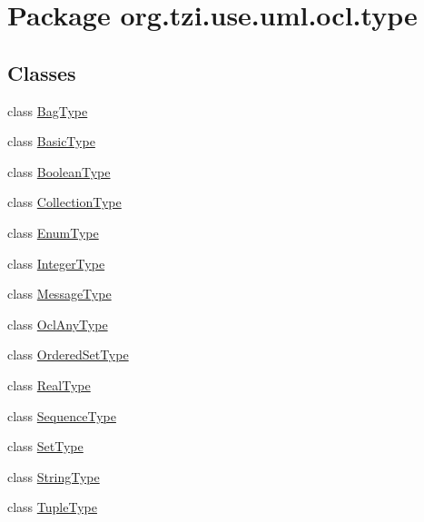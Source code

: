 \hypertarget{namespaceorg_1_1tzi_1_1use_1_1uml_1_1ocl_1_1type}{\section{Package org.\-tzi.\-use.\-uml.\-ocl.\-type}
\label{namespaceorg_1_1tzi_1_1use_1_1uml_1_1ocl_1_1type}
}
\subsection*{Classes}
\begin{DoxyCompactItemize}
\item 
class \hyperlink{classorg_1_1tzi_1_1use_1_1uml_1_1ocl_1_1type_1_1_bag_type}{Bag\-Type}
\item 
class \hyperlink{classorg_1_1tzi_1_1use_1_1uml_1_1ocl_1_1type_1_1_basic_type}{Basic\-Type}
\item 
class \hyperlink{classorg_1_1tzi_1_1use_1_1uml_1_1ocl_1_1type_1_1_boolean_type}{Boolean\-Type}
\item 
class \hyperlink{classorg_1_1tzi_1_1use_1_1uml_1_1ocl_1_1type_1_1_collection_type}{Collection\-Type}
\item 
class \hyperlink{classorg_1_1tzi_1_1use_1_1uml_1_1ocl_1_1type_1_1_enum_type}{Enum\-Type}
\item 
class \hyperlink{classorg_1_1tzi_1_1use_1_1uml_1_1ocl_1_1type_1_1_integer_type}{Integer\-Type}
\item 
class \hyperlink{classorg_1_1tzi_1_1use_1_1uml_1_1ocl_1_1type_1_1_message_type}{Message\-Type}
\item 
class \hyperlink{classorg_1_1tzi_1_1use_1_1uml_1_1ocl_1_1type_1_1_ocl_any_type}{Ocl\-Any\-Type}
\item 
class \hyperlink{classorg_1_1tzi_1_1use_1_1uml_1_1ocl_1_1type_1_1_ordered_set_type}{Ordered\-Set\-Type}
\item 
class \hyperlink{classorg_1_1tzi_1_1use_1_1uml_1_1ocl_1_1type_1_1_real_type}{Real\-Type}
\item 
class \hyperlink{classorg_1_1tzi_1_1use_1_1uml_1_1ocl_1_1type_1_1_sequence_type}{Sequence\-Type}
\item 
class \hyperlink{classorg_1_1tzi_1_1use_1_1uml_1_1ocl_1_1type_1_1_set_type}{Set\-Type}
\item 
class \hyperlink{classorg_1_1tzi_1_1use_1_1uml_1_1ocl_1_1type_1_1_string_type}{String\-Type}
\item 
class \hyperlink{classorg_1_1tzi_1_1use_1_1uml_1_1ocl_1_1type_1_1_tuple_type}{Tuple\-Type}

\end{DoxyCompactItemize}
